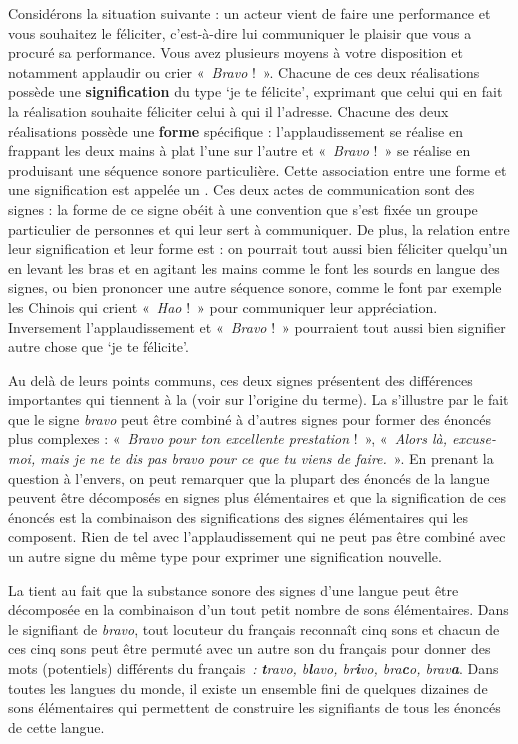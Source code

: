 Considérons la situation suivante : un acteur vient de faire une performance et vous souhaitez le féliciter, c’est-à-dire lui communiquer le plaisir que vous a procuré sa performance. Vous avez plusieurs moyens à votre disposition et notamment applaudir ou crier «~\textit{Bravo} !~». Chacune de ces deux réalisations possède une \textbf{signification} du type ‘je te félicite’, exprimant que celui qui en fait la réalisation souhaite féliciter celui à qui il l’adresse. Chacune des deux réalisations possède une \textbf{forme} spécifique : l’applaudis\-sement se réalise en frappant les deux mains à plat l’une sur l’autre et «~\textit{Bravo} !~» se réalise en produisant une séquence sonore particulière. Cette association entre une forme et une signification est appelée un . Ces deux actes de communication sont des signes : la forme de ce signe obéit à une convention que s’est fixée un groupe particulier de personnes et qui leur sert à communiquer. De plus, la relation entre leur signification et leur forme est : on pourrait tout aussi bien féliciter quelqu’un en levant les bras et en agitant les mains comme le font les sourds en langue des signes, ou bien prononcer une autre séquence sonore, comme le font par exemple les Chinois qui crient «~\textit{Hao} !~» pour communiquer leur appréciation. Inversement l’applaudissement et «~\textit{Bravo} !~» pourraient tout aussi bien signifier autre chose que ‘je te félicite’.

Au delà de leurs points communs, ces deux signes présentent des différences importantes qui tiennent à la  (voir  sur l’origine du terme). La  s’illustre par le fait que le signe \textit{bravo} peut être combiné à d’autres signes pour former des énoncés plus complexes : «~\textit{Bravo pour ton excellente prestation} !~», «~\textit{Alors là, excuse-moi, mais je ne te dis pas bravo pour ce que tu viens de faire.}~». En prenant la question à l’envers, on peut remarquer que la plupart des énoncés de la langue peuvent être décomposés en signes plus élémentaires et que la signification de ces énoncés est la combinaison des significations des signes élémentaires qui les composent. Rien de tel avec l’applaudissement qui ne peut pas être combiné avec un autre signe du même type pour exprimer une signification nouvelle.

La  tient au fait que la substance sonore des signes d’une langue peut être décomposée en la combinaison d’un tout petit nombre de sons élémentaires. Dans le signifiant de \textit{bravo}, tout locuteur du français reconnaît cinq sons et chacun de ces cinq sons peut être permuté avec un autre son du français pour donner des mots (potentiels) différents du français~\textit{:} \textbf{\textit{t}}\textit{ravo, b}\textbf{\textit{l}}\textit{avo, br}\textbf{\textit{i}}\textit{vo, bra}\textbf{\textit{c}}\textit{o, brav}\textbf{\textit{a}}. Dans toutes les langues du monde, il existe un ensemble fini de quelques dizaines de sons élémentaires qui permettent de construire les signifiants de tous les énoncés de cette langue.

